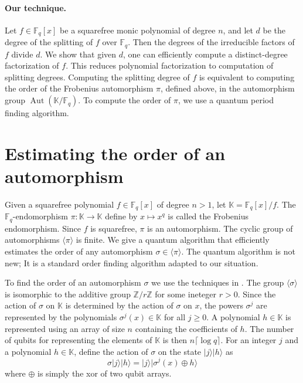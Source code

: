 \documentclass{article}
\theoremstyle{plain}
\theoremstyle{definition}
\newcommand{\lrang}[1]{\langle#1\rangle}
\newcommand{\ldbrac}[1]{\lvert#1\rangle}
\DeclareMathOperator{\Aut}{Aut}
\def\K{\ensuremath{\mathbb{K}}}
\def\Z{\ensuremath{\mathbb{Z}}}
\def\F{\ensuremath{\mathbb{F}}}
\begin{document}
\paragraph{Our technique.}
Let $f \in \F_q[x]$ be a squarefree monic polynomial of degree $n$, and let $d$ be the degree of the 
splitting of $f$ over $\F_q$. Then the degrees of the irreducible factors of $f$ divide $d$. We show 
that given $d$, one can efficiently compute a distinct-degree factorization of $f$. This reduces 
polynomial factorization to computation of splitting degrees. Computing the splitting degree of $f$ 
is equivalent to computing the order of the Frobenius automorphism $\pi$, defined above, in the 
automorphism group $\Aut(\K / \F_q)$. To compute the order of $\pi$, we use a quantum period 
finding algorithm. 





\section{Estimating the order of an automorphism}
\label{sec:ord-frob}

Given a squarefree polynomial $f \in \F_q[x]$ of degree $n > 1$, let $\K = \F_q[x] / f$. The 
$\F_q$-endomorphism $\pi: \K \rightarrow \K$ define by $x \mapsto x^q$ is called the Frobenius 
endomorphism. Since $f$ is squarefree, $\pi$ is an automorphism. The cyclic group of automorphisms 
$\lrang{\pi}$ is finite. We give a quantum algorithm that efficiently estimates the order of any 
automorphism $\sigma \in \lrang{\pi}$. The quantum algorithm is not new; It is a standard order 
finding algorithm adapted to our situation. 

To find the order of an automorphism $\sigma$ we use the techniques in \cite{kaye2007introduction, 
nielsen2010quantum}. The group $\lrang{\sigma}$ is isomorphic to the additive group $\Z/r\Z$ for 
some ineteger $r > 0$. Since the action of $\sigma$ on $\K$ is determined by the action of $\sigma$ 
on $x$, the powers $\sigma^j$ are represented by the polynomials $\sigma^j(x) \in \K$ for all $j 
\ge 0$. A polynomial $h \in \K$ is represented using an array of size $n$ containing the 
coefficients of $h$. The number of qubits for representing the elements of $\K$ is then $n\lceil 
\log q \rceil$. For an integer $j$ and a polynomial $h \in \K$, define the action of $\sigma$ on the 
state $\ldbrac{j} \ldbrac{h}$ as
\begin{equation}
	\label{equ:sig-act}
	\sigma \ldbrac{j}\ldbrac{h} = \ldbrac{j}\ldbrac{\sigma^j(x) \oplus h}
\end{equation}
where $\oplus$ is simply the xor of two qubit arrays.
\end{document}
